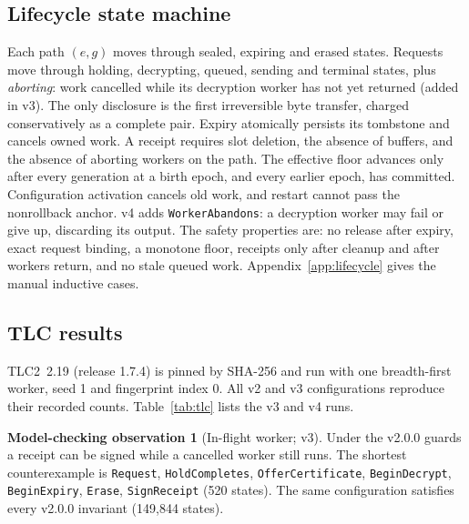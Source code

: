 \documentclass[pdflatex,sn-mathphys-num]{sn-jnl}
\theoremstyle{plain}
\theoremstyle{definition}
\newtheorem{observation}{Model-checking observation}
\newcommand{\code}[1]{\texttt{#1}}
\begin{document}
\subsection{Lifecycle state machine}
Each path $(e,g)$ moves through sealed, expiring and erased states. Requests move through holding, decrypting, queued, sending and terminal states, plus \emph{aborting}: work cancelled while its decryption worker has not yet returned (added in v3). The only disclosure is the first irreversible byte transfer, charged conservatively as a complete pair. Expiry atomically persists its tombstone and cancels owned work. A receipt requires slot deletion, the absence of buffers, and the absence of aborting workers on the path. The effective floor advances only after every generation at a birth epoch, and every earlier epoch, has committed. Configuration activation cancels old work, and restart cannot pass the nonrollback anchor. v4 adds \code{WorkerAbandons}: a decryption worker may fail or give up, discarding its output. The safety properties are: no release after expiry, exact request binding, a monotone floor, receipts only after cleanup and after workers return, and no stale queued work. Appendix~\ref{app:lifecycle} gives the manual inductive cases.

\subsection{TLC results}
TLC2~2.19 (release 1.7.4) is pinned by SHA-256 and run with one breadth-first worker, seed 1 and fingerprint index 0. All v2 and v3 configurations reproduce their recorded counts. Table~\ref{tab:tlc} lists the v3 and v4 runs.

\begin{observation}[In-flight worker; v3]\label{obs:inflight}
Under the v2.0.0 guards a receipt can be signed while a cancelled worker still runs. The shortest counterexample is \code{Request}, \code{HoldCompletes}, \code{OfferCertificate}, \code{BeginDecrypt}, \code{BeginExpiry}, \code{Erase}, \code{SignReceipt} (520 states). The same configuration satisfies every v2.0.0 invariant (149,844 states).
\end{observation}
\end{document}

